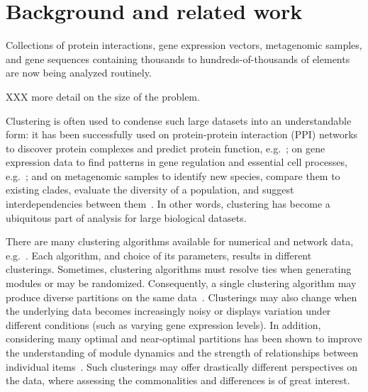 \documentclass[12pt]{cmuthesis}
\makeatletter
\newcommand{\eg}{e.g.\@}
\makeatother
\begin{document}
\section{Background and related work}



  Collections of protein interactions, gene expression vectors, metagenomic samples, and gene sequences containing thousands to hundreds-of-thousands of elements are now being analyzed routinely. 

  XXX more detail on the size of the problem. 

  Clustering is often used to condense such large datasets into an understandable form: it has been successfully used on protein-protein interaction (PPI) networks to discover protein complexes and predict protein function, \eg~\cite{Sharan2007}; on gene expression data to find patterns in gene regulation and essential cell processes, \eg~\cite{Ulitsky2010}; and on metagenomic samples to identify new species, compare them to existing clades, evaluate the diversity of a population, and suggest interdependencies between them~\cite{Chatterji2007, White2010}. In other words, clustering has become a ubiquitous part of analysis for large biological datasets.


  There are many clustering algorithms available for numerical and network data, \eg~\cite{VanDongen2000, Bader2003, Clauset2004, Adamcsek2006, Blondel2008, Ahn2010, Jiang2010, Rhrissorrakrai2011}. Each algorithm, and choice of its parameters, results in different clusterings. Sometimes, clustering algorithms must resolve ties when generating modules or may be randomized. Consequently, a single clustering algorithm may produce diverse partitions on the same data~\cite{Navlakha10}. Clusterings may also change when the underlying data becomes increasingly noisy or displays variation under different conditions (such as varying gene expression levels). In addition, considering many optimal and near-optimal partitions has been shown to improve the understanding of module dynamics and the strength of relationships between individual items~\cite{Duggal2010, Lewis2010, Langfelder2008, Hopcroft2004}. Such clusterings may offer drastically different perspectives on the data, where assessing the commonalities and differences is of great interest.

\end{document}
